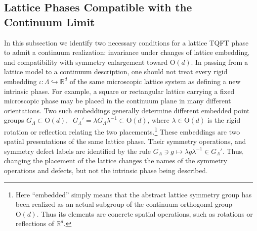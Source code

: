 \documentclass[aps,prx,reprint,superscriptaddress,twocolumn,amsmath,amssymb,amsfonts, nofootinbib]{revtex4-2}
\theoremstyle{apsstyle}
\begin{document}
\subsection{Lattice Phases Compatible with the Continuum Limit}
\label{sec:lattice_compatible_continuum_limit}

In this subsection we identify two necessary conditions for a lattice TQFT phase to admit a continuum realization: invariance under changes of lattice embedding, and compatibility with symmetry enlargement toward $\mathrm{O}(d)$. In passing from a lattice model to a continuum description, one should not treat every rigid embedding $\iota:\Lambda\hookrightarrow\mathbb R^d$ of the same microscopic lattice system as defining a new intrinsic phase. For example, a square or rectangular lattice carrying a fixed microscopic phase may be placed in the continuum plane in many different orientations. Two such embeddings generally determine different embedded point groups $G_{\Lambda}\subset \mathrm{O}(d), \;\; G_{\Lambda}'=\lambda G_{\Lambda}\lambda^{-1}\subset \mathrm{O}(d)$, where $\lambda\in \mathrm{O}(d)$ is the rigid rotation or reflection relating the two placements.\footnote{Here ``embedded'' simply means that the abstract lattice symmetry group has been realized as an actual subgroup of the continuum orthogonal group $\mathrm{O}(d)$. Thus its elements are concrete spatial operations, such as rotations or reflections of $\mathbb R^d$.} These embeddings are two spatial presentations of the same lattice phase. Their symmetry operations, and  symmetry defect labels are identified by the rule $G_{\Lambda}\ni g\longmapsto \lambda g\lambda^{-1}\in G_{\Lambda}'$. Thus, changing the placement of the lattice changes the names of the symmetry operations and defects, but not the intrinsic phase being described.

\bigskip 
\end{document}

